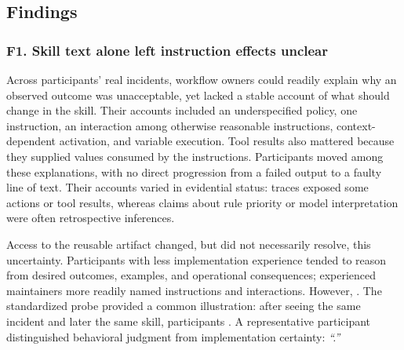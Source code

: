 \subsection{Findings}
\label{sec:formative-findings}


\subsubsection{F1. Skill text alone left instruction effects unclear}
\label{sec:f1-locus}

Across participants' real incidents, 
workflow owners could readily explain why an observed outcome was unacceptable,
yet lacked a stable account of what should change in the skill. Their accounts
included an underspecified policy, one instruction, an interaction among
otherwise reasonable instructions, context-dependent activation, and variable
execution. Tool results also mattered because they supplied values consumed by
the instructions. Participants moved among these explanations, with no direct
progression from a failed output to a faulty line of text. Their accounts varied in
evidential status: traces exposed some actions or tool results, whereas claims
about rule priority or model interpretation were often retrospective
inferences. 

Access to the reusable artifact changed, but did not necessarily resolve, this
uncertainty. Participants with less implementation experience tended to reason
from desired outcomes, examples, and operational consequences; experienced
maintainers more readily named instructions and interactions. However,
. The
standardized probe
provided a common illustration: after seeing the same incident and later the
same skill, participants . A
representative participant distinguished
behavioral judgment from implementation certainty: \emph{``.''}

